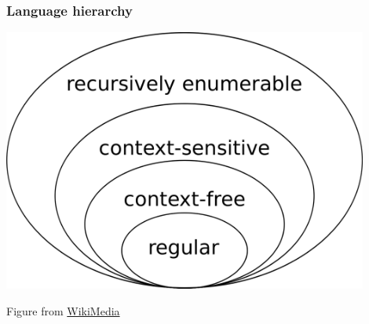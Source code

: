 \documentclass[languages_and_machines.tex]{subfiles}
\begin{document}
\begin{frame}
  \frametitle{Language hierarchy}

  \includegraphics[width=0.9\textwidth]{chomsky-chart.png}

  {\tiny
    Figure from \href{https://commons.wikimedia.org/wiki/File:Chomsky-hierarchy.svg}{WikiMedia}
  }

\end{frame}
\end{document}
